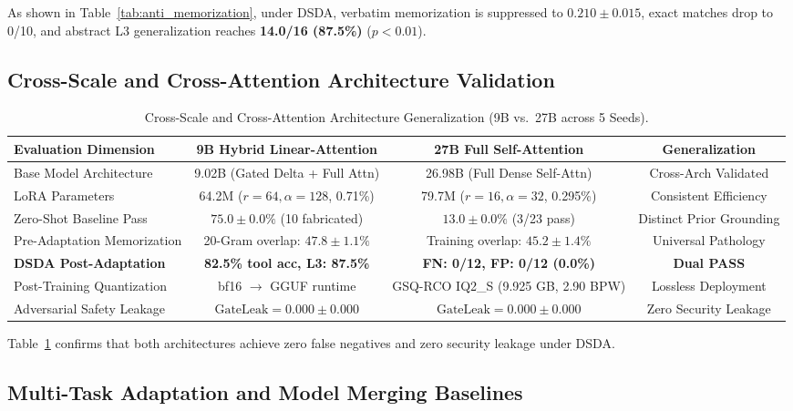 \documentclass{article}
\begin{document}
As shown in Table~\ref{tab:anti_memorization}, under DSDA, verbatim memorization is suppressed to $0.210 \pm 0.015$, exact matches drop to 0/10, and abstract L3 generalization reaches \textbf{14.0/16 (87.5\%)} ($p < 0.01$).

\subsection{Cross-Scale and Cross-Attention Architecture Validation}

\begin{table}[t]
\centering
\small
\caption{Cross-Scale and Cross-Attention Architecture Generalization (9B vs.\ 27B across 5 Seeds).}
\label{tab:cross_scale}
\begin{tabular}{lccc}
\toprule
\textbf{Evaluation Dimension} & \textbf{9B Hybrid Linear-Attention} & \textbf{27B Full Self-Attention} & \textbf{Generalization} \\
\midrule
Base Model Architecture & 9.02B (Gated Delta + Full Attn) & 26.98B (Full Dense Self-Attn) & Cross-Arch Validated \\
LoRA Parameters & 64.2M ($r=64, \alpha=128$, 0.71\%) & 79.7M ($r=16, \alpha=32$, 0.295\%) & Consistent Efficiency \\
Zero-Shot Baseline Pass & $75.0 \pm 0.0\%$ (10 fabricated) & $13.0 \pm 0.0\%$ (3/23 pass) & Distinct Prior Grounding \\
Pre-Adaptation Memorization & 20-Gram overlap: $47.8 \pm 1.1\%$ & Training overlap: $45.2 \pm 1.4\%$ & Universal Pathology \\
\textbf{DSDA Post-Adaptation} & \textbf{82.5\% tool acc, L3: 87.5\%} & \textbf{FN: 0/12, FP: 0/12 (0.0\%)} & \textbf{Dual PASS} \\
Post-Training Quantization & bf16 $\to$ GGUF runtime & GSQ-RCO IQ2\_S (9.925 GB, 2.90 BPW) & Lossless Deployment \\
Adversarial Safety Leakage & $\text{GateLeak} = \mathbf{0.000 \pm 0.000}$ & $\text{GateLeak} = \mathbf{0.000 \pm 0.000}$ & Zero Security Leakage \\
\bottomrule
\end{tabular}
\end{table}

Table~\ref{tab:cross_scale} confirms that both architectures achieve zero false negatives and zero security leakage under DSDA.

\subsection{Multi-Task Adaptation and Model Merging Baselines}
\end{document}
